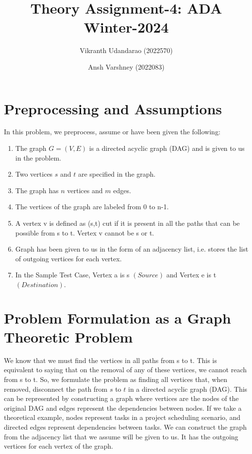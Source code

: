 \documentclass{article}
\title{Theory Assignment-4: ADA Winter-2024}
\author{Vikranth Udandarao (2022570) \and Ansh Varshney (2022083)}
\date{}
\begin{document}
\maketitle


\section{Preprocessing and Assumptions}
    In this problem, we preprocess, assume or have been given the following:

    \begin{enumerate}
        \item The graph $G = (V, E)$ is a directed acyclic graph (DAG) and is given to us in the problem.
        \item Two vertices $s$ and $t$ are specified in the graph.
        \item The graph has $n$ vertices and $m$ edges.
        \item The vertices of the graph are labeled from 0 to n-1.
        \item A vertex v is defined as (s,t) cut if it is present in all the paths that can be possible from s to t. Vertex v cannot be s or t.
        \item Graph has been given to us in the form of an adjacency list, i.e. stores the list of outgoing vertices for each vertex.
        \item In the Sample Test Case, Vertex a is s $(Source)$ and Vertex e is t $(Destination)$.
    \end{enumerate}


\section{Problem Formulation as a Graph Theoretic Problem}
    We know that we must find the vertices in all paths from s to t. This is equivalent to saying that on the removal of any of these vertices, we cannot reach from s to t. So, we formulate the problem as finding all vertices that, when removed, disconnect the path from $s$ to $t$ in a directed acyclic graph (DAG). This can be represented by constructing a graph where vertices are the nodes of the original DAG and edges represent the dependencies between nodes. If we take a theoretical example, nodes represent tasks in a project scheduling scenario, and directed edges represent dependencies between tasks. We can construct the graph from the adjacency list that we assume will be given to us. It has the outgoing vertices for each vertex of the graph.
\end{document}
